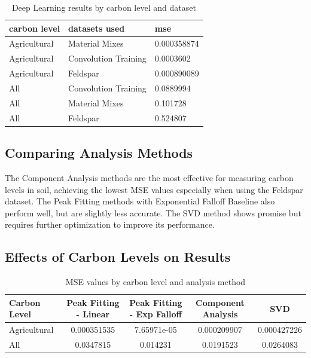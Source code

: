 \documentclass[review]{elsarticle}
\begin{document}
\begin{table}[H]
\centering
\caption{Deep Learning results by carbon level and dataset}
\label{tab:deep_learning_results}
\begin{tabular}{@{}lll@{}}
\toprule
carbon level & datasets used & mse \\
\midrule
Agricultural & Material Mixes & 0.000358874 \\
Agricultural & Convolution Training & 0.0003602 \\
Agricultural & Feldspar & 0.000890089 \\
All & Convolution Training & 0.0889994 \\
All & Material Mixes & 0.101728 \\
All & Feldspar & 0.524807 \\
\bottomrule
\end{tabular}
\end{table}

\subsection{Comparing Analysis Methods}

The Component Analysis methods are the most effective for measuring carbon levels in soil, achieving the lowest MSE values especially when using the Feldspar dataset. The Peak Fitting methods with Exponential Falloff Baseline also perform well, but are slightly less accurate. The SVD method shows promise but requires further optimization to improve its performance.

\subsection{Effects of Carbon Levels on Results}

\begin{table}[H]
\centering
\caption{MSE values by carbon level and analysis method}
\label{tab:carbon_level_results}
\begin{tabular}{@{}lcccc@{}}
\toprule
Carbon Level & Peak Fitting - Linear & Peak Fitting - Exp Falloff & Component Analysis & SVD \\
\midrule
Agricultural & 0.000351535 & 7.65971e-05 & 0.000209907 & 0.000427226 \\
All & 0.0347815 & 0.014231 & 0.0191523 & 0.0264083 \\
\bottomrule
\end{tabular}
\end{table}
\end{document}
